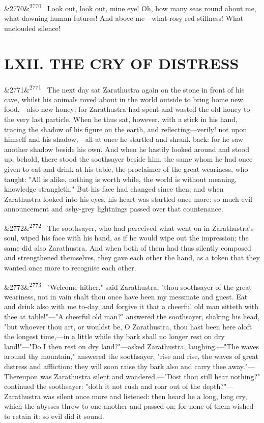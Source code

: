 \documentclass[12pt]{article}
\newcommand{\para}[1][]{\par\noindent\ifx&#1&\else\textsuperscript{\footnotesize #1}~\fi}
\begin{document}
\para[2770] Look out, look out, mine eye! Oh, how many seas round about me, what dawning human futures! And above me---what rosy red stillness! What unclouded silence!

\section*{LXII. THE CRY OF DISTRESS}

\para[2771] The next day sat Zarathustra again on the stone in front of his cave, whilst his animals roved about in the world outside to bring home new food,---also new honey: for Zarathustra had spent and wasted the old honey to the very last particle. When he thus sat, however, with a stick in his hand, tracing the shadow of his figure on the earth, and reflecting---verily! not upon himself and his shadow,---all at once he startled and shrank back: for he saw another shadow beside his own. And when he hastily looked around and stood up, behold, there stood the soothsayer beside him, the same whom he had once given to eat and drink at his table, the proclaimer of the great weariness, who taught: "All is alike, nothing is worth while, the world is without meaning, knowledge strangleth." But his face had changed since then; and when Zarathustra looked into his eyes, his heart was startled once more: so much evil announcement and ashy-grey lightnings passed over that countenance.

\para[2772] The soothsayer, who had perceived what went on in Zarathustra's soul, wiped his face with his hand, as if he would wipe out the impression; the same did also Zarathustra. And when both of them had thus silently composed and strengthened themselves, they gave each other the hand, as a token that they wanted once more to recognise each other.

\para[2773] "Welcome hither," said Zarathustra, "thou soothsayer of the great weariness, not in vain shalt thou once have been my messmate and guest. Eat and drink also with me to-day, and forgive it that a cheerful old man sitteth with thee at table!"---"A cheerful old man?" answered the soothsayer, shaking his head, "but whoever thou art, or wouldst be, O Zarathustra, thou hast been here aloft the longest time,---in a little while thy bark shall no longer rest on dry land!"---"Do I then rest on dry land?"---asked Zarathustra, laughing.---"The waves around thy mountain," answered the soothsayer, "rise and rise, the waves of great distress and affliction: they will soon raise thy bark also and carry thee away."---Thereupon was Zarathustra silent and wondered.---"Dost thou still hear nothing?" continued the soothsayer: "doth it not rush and roar out of the depth?"---Zarathustra was silent once more and listened: then heard he a long, long cry, which the abysses threw to one another and passed on; for none of them wished to retain it: so evil did it sound.
\end{document}
